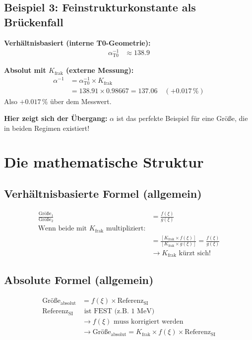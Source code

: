 	\subsection{Beispiel 3: Feinstrukturkonstante als Brückenfall}
	
	\textbf{Verhältnisbasiert (interne T0-Geometrie):}
	\begin{align*}
		\alpha_{\text{T0}}^{-1} &\approx 138.9
	\end{align*}
	
	\textbf{Absolut mit $K_{\text{frak}}$ (externe Messung):}
	\begin{align*}
		\alpha^{-1} &= \alpha_{\text{T0}}^{-1} \times K_{\text{frak}} \\
		&= 138.91 \times 0.98667 = 137.06 \quad (+0.017\,\%)
	\end{align*}
	Also $+0.017\,\%$ über dem Messwert.
	
	\textbf{Hier zeigt sich der Übergang:} $\alpha$ ist das perfekte Beispiel für eine Größe, die in beiden Regimen existiert!
	
	\section{Die mathematische Struktur}
	
	\subsection{Verhältnisbasierte Formel (allgemein)}
	\begin{align*}
		\frac{\text{Größe}_1}{\text{Größe}_2} &= \frac{f(\xi)}{g(\xi)} \\
		\text{Wenn beide mit $K_{\text{frak}}$ multipliziert:} & \\
		&= \frac{[K_{\text{frak}} \times f(\xi)]}{[K_{\text{frak}} \times g(\xi)]} = \frac{f(\xi)}{g(\xi)} \\
		&\rightarrow K_{\text{frak}} \text{ kürzt sich!}
	\end{align*}
	
	\subsection{Absolute Formel (allgemein)}
	\begin{align*}
		\text{Größe}_{\text{absolut}} &= f(\xi) \times \text{Referenz}_{\text{SI}} \\
		\text{Referenz}_{\text{SI}} &\text{ ist FEST (z.B. 1 MeV)} \\
		&\rightarrow f(\xi) \text{ muss korrigiert werden} \\
		&\rightarrow \text{Größe}_{\text{absolut}} = K_{\text{frak}} \times f(\xi) \times \text{Referenz}_{\text{SI}}
	\end{align*}
	
